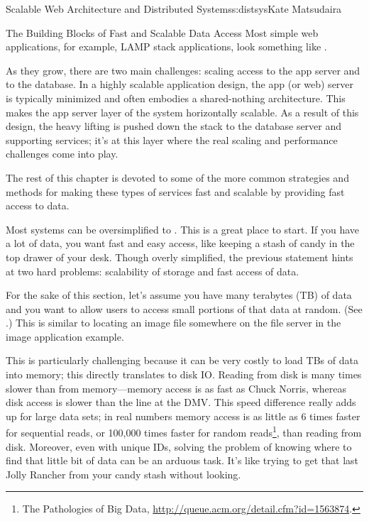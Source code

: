 \begin{aosachapter}{Scalable Web Architecture and Distributed Systems}{s:distsys}{Kate Matsudaira}
\begin{aosasect1}{The Building Blocks of Fast and Scalable Data Access}
Most simple web applications, for example, LAMP stack applications,
look something like .


As they grow, there are two main challenges: scaling access to the
app server and to the database. In a highly scalable application
design, the app (or web) server is typically minimized and often
embodies a shared-nothing architecture. This makes the app server
layer of the system horizontally scalable. As a result of this design,
the heavy lifting is pushed down the stack to the database server and
supporting services; it's at this layer where the real scaling and
performance challenges come into play.

The rest of this chapter is devoted to some of the more common
strategies and methods for making these types of services fast and
scalable by providing fast access to data.


Most systems can be oversimplified to .
This is a great place to start. If you have a lot of data, you want
fast and easy access, like keeping a stash of candy in the top drawer
of your desk. Though overly simplified, the previous statement hints
at two hard problems: scalability of storage and fast access of data.

For the sake of this section, let's assume you have many terabytes (TB)
of data and you want to allow users to access small portions 
of that data at random. (See .) 
This is similar to locating an image file
somewhere on the file server in the image application example.


This is particularly challenging because it can be very costly to load
TBs of data into memory; this directly translates to disk IO. Reading
from disk is many times slower than from memory---memory access is
as fast as Chuck Norris, whereas disk access is slower than the
line at the DMV. This speed difference really adds up for large
data sets; in real numbers memory access is as little as 6 times
faster for sequential reads, or 100,000 times faster for random
reads\footnote{The Pathologies of Big Data,
  \url{http://queue.acm.org/detail.cfm?id=1563874}.}, than reading from
disk. Moreover, even with unique IDs, solving the problem of
knowing where to find that little bit of data can be an arduous
task. It's like 
trying to get that last Jolly Rancher from your candy stash without
looking.


\end{aosasect1}
\end{aosachapter}
